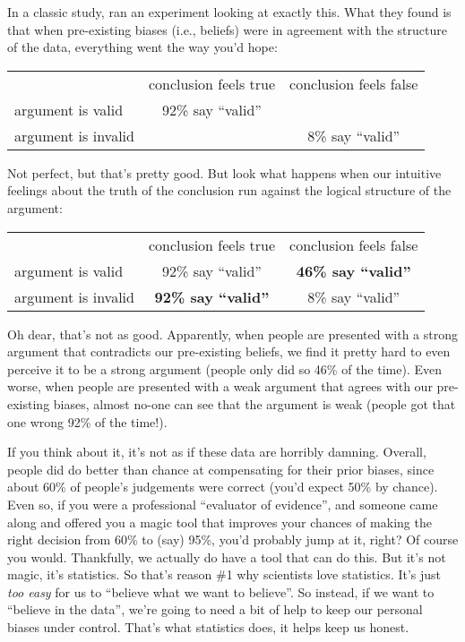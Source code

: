 In a classic study, \textcite{Evans1983} ran an experiment looking at exactly this. What they found is that when pre-existing biases (i.e., beliefs) were in agreement with the structure of the data, everything went the way you'd hope: 
\begin{center}
\begin{tabular}{lcc}
\hline
~                   & conclusion feels true & conclusion feels false \\
\cline{2-3}
argument is valid   & 92\% say ``valid''    & ~                      \\
argument is invalid & ~                     & 8\% say ``valid''      \\
\hline
\end{tabular}
\end{center}
Not perfect, but that's pretty good. But look what happens when our intuitive feelings about the truth of the conclusion run against the logical structure of the argument:
\begin{center}
\begin{tabular}{lcc}
\hline
~                   & conclusion feels true    & conclusion feels false   \\
\cline{2-3}
argument is valid   &      92\% say ``valid''  & {\bf 46\% say ``valid''} \\
argument is invalid & {\bf 92\% say ``valid''} &       8\% say ``valid''  \\ 
\hline
\end{tabular}
\end{center}
Oh dear, that's not as good. Apparently, when people are presented with a strong argument that contradicts our pre-existing beliefs, we find it pretty hard to even perceive it to be a strong argument (people only did so 46\% of the time). Even worse, when people are presented with a weak argument that agrees with our pre-existing biases, almost no-one can see that the argument is weak (people got that one wrong 92\% of the time!).

If you think about it, it's not as if these data are horribly damning. Overall, people did do better than chance at compensating for their prior biases, since about 60\% of people's judgements were correct (you'd expect 50\% by chance). Even so, if you were a professional ``evaluator of evidence'', and someone came along and offered you a magic tool that improves your chances of making the right decision from 60\% to (say) 95\%, you'd probably jump at it, right? Of course you would. Thankfully, we actually do have a tool that can do this. But it's not magic, it's statistics. So that's reason \#1 why scientists love statistics. It's just {\it too easy} for us to ``believe what we want to believe''. So instead, if we want to ``believe in the data'', we're going to need a bit of help to keep our personal biases under control. That's what statistics does,  it helps keep us honest.


